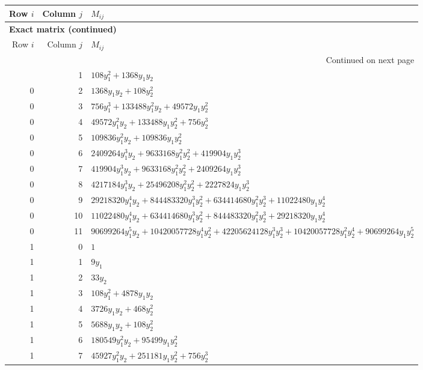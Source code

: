 \documentclass[10pt,a4paper]{article}
\begin{document}
{\small\setlength{\tabcolsep}{7pt}\begin{longtable}{rrp{125mm}}
\toprule Row $i$ & Column $j$ & $M_{ij}$\\\midrule\endfirsthead
\multicolumn{3}{l}{\textbf{Exact matrix (continued)}}\\
\toprule Row $i$ & Column $j$ & $M_{ij}$\\\midrule\endhead
\midrule\multicolumn{3}{r}{Continued on next page}\\\endfoot\bottomrule\endlastfoot
0 & 1 & $108 y_{1}^{2} + 1368 y_{1} y_{2}$\\
0 & 2 & $1368 y_{1} y_{2} + 108 y_{2}^{2}$\\
0 & 3 & $756 y_{1}^{3} + 133488 y_{1}^{2} y_{2} + 49572 y_{1} y_{2}^{2}$\\
0 & 4 & $49572 y_{1}^{2} y_{2} + 133488 y_{1} y_{2}^{2} + 756 y_{2}^{3}$\\
0 & 5 & $109836 y_{1}^{2} y_{2} + 109836 y_{1} y_{2}^{2}$\\
0 & 6 & $2409264 y_{1}^{3} y_{2} + 9633168 y_{1}^{2} y_{2}^{2} + 419904 y_{1} y_{2}^{3}$\\
0 & 7 & $419904 y_{1}^{3} y_{2} + 9633168 y_{1}^{2} y_{2}^{2} + 2409264 y_{1} y_{2}^{3}$\\
0 & 8 & $4217184 y_{1}^{3} y_{2} + 25496208 y_{1}^{2} y_{2}^{2} + 2227824 y_{1} y_{2}^{3}$\\
0 & 9 & $29218320 y_{1}^{4} y_{2} + 844483320 y_{1}^{3} y_{2}^{2} + 634414680 y_{1}^{2} y_{2}^{3} + 11022480 y_{1} y_{2}^{4}$\\
0 & 10 & $11022480 y_{1}^{4} y_{2} + 634414680 y_{1}^{3} y_{2}^{2} + 844483320 y_{1}^{2} y_{2}^{3} + 29218320 y_{1} y_{2}^{4}$\\
0 & 11 & $90699264 y_{1}^{5} y_{2} + 10420057728 y_{1}^{4} y_{2}^{2} + 42205624128 y_{1}^{3} y_{2}^{3} + 10420057728 y_{1}^{2} y_{2}^{4} + 90699264 y_{1} y_{2}^{5}$\\
1 & 0 & $1$\\
1 & 1 & $9 y_{1}$\\
1 & 2 & $33 y_{2}$\\
1 & 3 & $108 y_{1}^{2} + 4878 y_{1} y_{2}$\\
1 & 4 & $3726 y_{1} y_{2} + 468 y_{2}^{2}$\\
1 & 5 & $5688 y_{1} y_{2} + 108 y_{2}^{2}$\\
1 & 6 & $180549 y_{1}^{2} y_{2} + 95499 y_{1} y_{2}^{2}$\\
1 & 7 & $45927 y_{1}^{2} y_{2} + 251181 y_{1} y_{2}^{2} + 756 y_{2}^{3}$\\

\end{longtable}}
\end{document}
